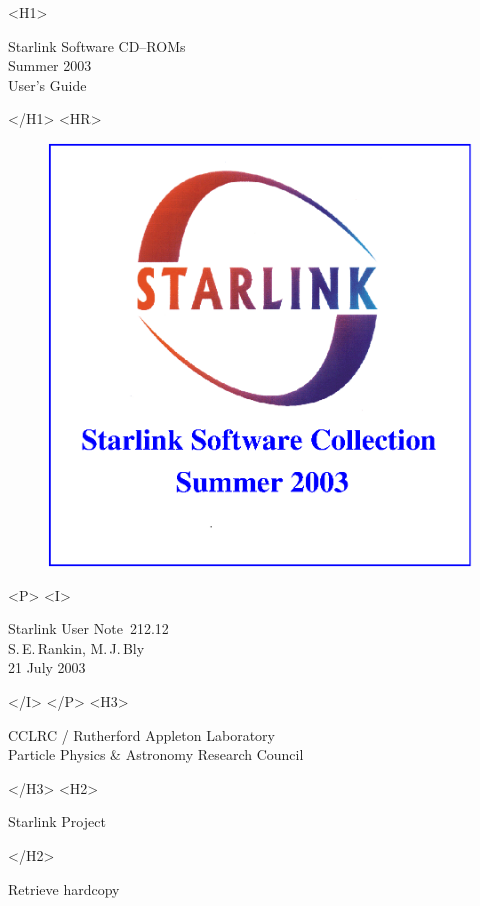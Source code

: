 \documentclass[twoside,11pt]{article}
\newcommand{\stardoccategory}  {Starlink User Note}
\newcommand{\stardocsource}    {sun\stardocnumber}
\newcommand{\stardocnumber}    {212.12}
\newcommand{\stardocauthors}   {S.\,E.\,Rankin, M.\,J.\,Bly}
\newcommand{\stardocdate}      {21 July 2003}
\newcommand{\stardoctitle}     {Starlink Software CD--ROMs}
\newcommand{\stardocversion}   {Summer 2003}
\newcommand{\stardocmanual}    {User's Guide}
\newcommand{\htmladdnormallink}[2]{#1}
\newcommand{\htmladdimg}[1]{}
\newcommand{\xlabel}[1]{}
\renewcommand{\_}{\texttt{\symbol{95}}}
\begin{document}
\begin{htmlonly}
   \xlabel{}
   \begin{rawhtml} <H1> \end{rawhtml}
      \stardoctitle\\
      \stardocversion\\
      \stardocmanual
   \begin{rawhtml} </H1> <HR> \end{rawhtml}

  \begin{figure}[h]
  \includegraphics[scale=0.7]{sun212_cover.eps}
  \end{figure}

   \begin{rawhtml} <P> <I> \end{rawhtml}
   \stardoccategory\ \stardocnumber \\
   \stardocauthors \\
   \stardocdate
   \begin{rawhtml} </I> </P> <H3> \end{rawhtml}
      \htmladdnormallink{CCLRC / Rutherford Appleton Laboratory}
                        {http://www.cclrc.ac.uk} \\
      \htmladdnormallink{Particle Physics \& Astronomy Research Council}
                        {http://www.pparc.ac.uk} \\
   \begin{rawhtml} </H3> <H2> \end{rawhtml}
      \htmladdnormallink{Starlink Project}{http://www.starlink.ac.uk/}
   \begin{rawhtml} </H2> \end{rawhtml}
   \htmladdnormallink{\htmladdimg{source.gif} Retrieve hardcopy}
      {http://www.starlink.ac.uk/cgi-bin/hcserver?\stardocsource}\\


\end{htmlonly}
\end{document}
